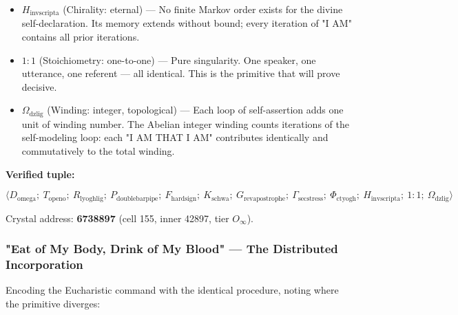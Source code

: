 \documentclass[12pt,a4paper]{article}
\begin{document}
\begin{itemize}
    \item \textbf{$H_{\text{invscripta}}$} (Chirality: eternal) --- No finite Markov order exists for the divine self-declaration. Its memory extends without bound; every iteration of "I AM" contains all prior iterations.
    \item \textbf{$1{:}1$} (Stoichiometry: one-to-one) --- Pure singularity. One speaker, one utterance, one referent --- all identical. This is the primitive that will prove decisive.
    \item \textbf{$\Omega_{\text{dzlig}}$} (Winding: integer, topological) --- Each loop of self-assertion adds one unit of winding number. The Abelian integer winding counts iterations of the self-modeling loop: each "I AM THAT I AM" contributes identically and commutatively to the total winding.
\end{itemize}

\textbf{Verified tuple:}


\[\langle D_{\text{omega}};\ T_{\text{openo}};\ R_{\text{lyoghlig}};\ P_{\text{doublebarpipe}};\ F_{\text{hardsign}};\ K_{\text{schwa}};\ G_{\text{revapostrophe}};\ \Gamma_{\text{secstress}};\ \Phi_{\text{ctyogh}};\ H_{\text{invscripta}};\ 1{:}1;\ \Omega_{\text{dzlig}} \rangle\]

Crystal address: \textbf{6738897} (cell 155, inner 42897, tier $O_{\infty}$).

\subsubsection{"Eat of My Body, Drink of My Blood" --- The Distributed Incorporation}

Encoding the Eucharistic command with the identical procedure, noting where the primitive diverges:
\end{document}
